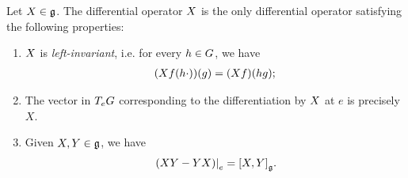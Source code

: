 \begin{proposition}
    Let $X \in \mathfrak{g}$.
    The differential operator ${X}$ is the only differential operator satisfying the following properties:
    \begin{enumerate}
        \item ${X}$ is \emph{left-invariant},
            i.e. for every $h \in G$, we have
            \begin{align*}
                (X f(h \cdot))(g) = (X f)(h g);
            \end{align*}
        \item The vector in $T_e G$ corresponding to the differentiation by ${X}$ at $e$ is precisely $X$.
        \item Given $X, Y \in \mathfrak{g}$, we have
            \begin{align*}
                \eval{%
                    (\LeftDifferentialOperatorFirstOrder{X} \LeftDifferentialOperatorFirstOrder{Y} - \LeftDifferentialOperatorFirstOrder{Y} \LeftDifferentialOperatorFirstOrder{X})
                }{e}
                = \LeftDifferentialOperatorFirstOrder{\LieBracket{X}{Y}}.
            \end{align*}
    \end{enumerate}
\end{proposition}

